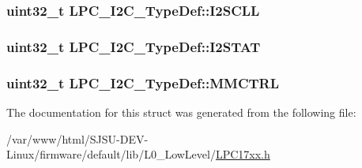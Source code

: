 \subsubsection[{\texorpdfstring{I2\+S\+C\+LL}{I2SCLL}}]{ uint32\+\_\+t L\+P\+C\+\_\+\+I2\+C\+\_\+\+Type\+Def\+::\+I2\+S\+C\+LL}\hypertarget{structLPC__I2C__TypeDef_acb1c72614b4277afac12c2152a47dc26}{}\label{structLPC__I2C__TypeDef_acb1c72614b4277afac12c2152a47dc26}
\subsubsection[{\texorpdfstring{I2\+S\+T\+AT}{I2STAT}}]{ uint32\+\_\+t L\+P\+C\+\_\+\+I2\+C\+\_\+\+Type\+Def\+::\+I2\+S\+T\+AT}\hypertarget{structLPC__I2C__TypeDef_a31c1d47ac80feae537f5e52a1822ac35}{}\label{structLPC__I2C__TypeDef_a31c1d47ac80feae537f5e52a1822ac35}
\subsubsection[{\texorpdfstring{M\+M\+C\+T\+RL}{MMCTRL}}]{ uint32\+\_\+t L\+P\+C\+\_\+\+I2\+C\+\_\+\+Type\+Def\+::\+M\+M\+C\+T\+RL}\hypertarget{structLPC__I2C__TypeDef_a132689ac34ccf6d86dc52216b4c4987c}{}\label{structLPC__I2C__TypeDef_a132689ac34ccf6d86dc52216b4c4987c}


The documentation for this struct was generated from the following file\+:\begin{DoxyCompactItemize}
\item 
/var/www/html/\+S\+J\+S\+U-\/\+D\+E\+V-\/\+Linux/firmware/default/lib/\+L0\+\_\+\+Low\+Level/\hyperlink{LPC17xx_8h}{L\+P\+C17xx.\+h}\end{DoxyCompactItemize}

